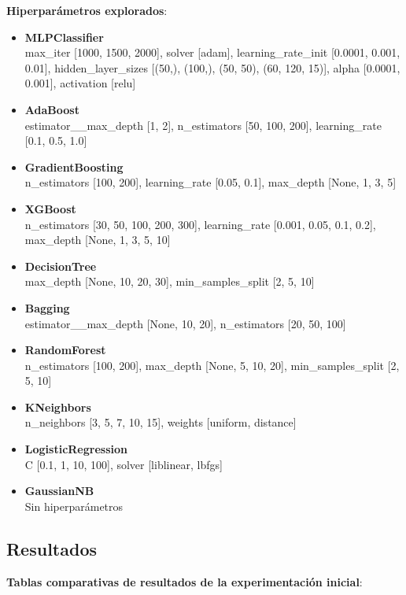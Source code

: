 \documentclass{article}
\begin{document}
\textbf{Hiperparámetros explorados}:
\begin{itemize}
    \item \textbf{MLPClassifier} \\max\_iter [1000, 1500, 2000], solver [adam], learning\_rate\_init [0.0001, 0.001, 0.01], hidden\_layer\_sizes [(50,), (100,), (50, 50), (60, 120, 15)], alpha [0.0001, 0.001], activation [relu]
    \item \textbf{AdaBoost} \\estimator\_\_max\_depth [1, 2], n\_estimators [50, 100, 200], learning\_rate [0.1, 0.5, 1.0]
    \item \textbf{GradientBoosting} \\n\_estimators [100, 200], learning\_rate [0.05, 0.1], max\_depth [None, 1, 3, 5]
    \item \textbf{XGBoost} \\n\_estimators [30, 50, 100, 200, 300], learning\_rate [0.001, 0.05, 0.1, 0.2], max\_depth [None, 1, 3, 5, 10]
    \item \textbf{DecisionTree} \\max\_depth [None, 10, 20, 30], min\_samples\_split [2, 5, 10]
    \item \textbf{Bagging} \\estimator\_\_max\_depth [None, 10, 20], n\_estimators [20, 50, 100]
    \item \textbf{RandomForest} \\n\_estimators [100, 200], max\_depth [None, 5, 10, 20], min\_samples\_split [2, 5, 10]
    \item \textbf{KNeighbors} \\n\_neighbors [3, 5, 7, 10, 15], weights [uniform, distance]
    \item \textbf{LogisticRegression} \\C [0.1, 1, 10, 100], solver [liblinear, lbfgs]
    \item \textbf{GaussianNB} \\Sin hiperparámetros
\end{itemize}

\subsection*{Resultados}

\textbf{Tablas comparativas de resultados de la experimentación inicial}:
\end{document}
